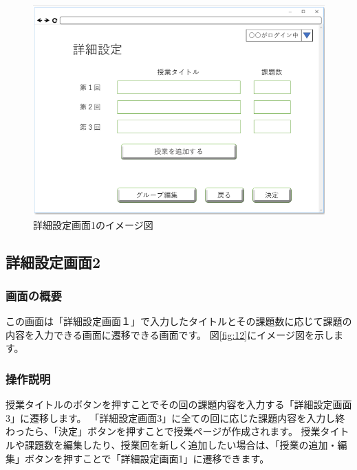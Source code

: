 \begin{figure}[htbp]
  \begin{center}
    \includegraphics[width=1\linewidth,clip]{./img/11.png}
    \caption{詳細設定画面1のイメージ図}\label{fig:11}
  \end{center}
\end{figure}

\newpage

\subsection{詳細設定画面2}
\subsubsection{画面の概要}
この画面は「詳細設定画面１」で入力したタイトルとその課題数に応じて課題の内容を入力できる画面に遷移できる画面です。
図\ref{fig:12}にイメージ図を示します。

\subsubsection{操作説明}
授業タイトルのボタンを押すことでその回の課題内容を入力する「詳細設定画面3」に遷移します。
「詳細設定画面3」に全ての回に応じた課題内容を入力し終わったら、「決定」ボタンを押すことで授業ページが作成されます。
授業タイトルや課題数を編集したり、授業回を新しく追加したい場合は、「授業の追加・編集」ボタンを押すことで「詳細設定画面1」に遷移できます。

